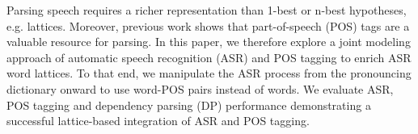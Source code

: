 Parsing speech requires a richer representation than 1-best or n-best hypotheses, e.g. lattices. Moreover, previous work shows that part-of-speech (POS) tags are a valuable resource for parsing. In this paper, we therefore explore a joint modeling approach of automatic speech recognition (ASR) and POS tagging to enrich ASR word lattices. To that end, we manipulate the ASR process from the pronouncing dictionary onward to use word-POS pairs instead of words. We evaluate ASR, POS tagging and dependency parsing (DP) performance demonstrating a successful lattice-based integration of ASR and POS tagging.
